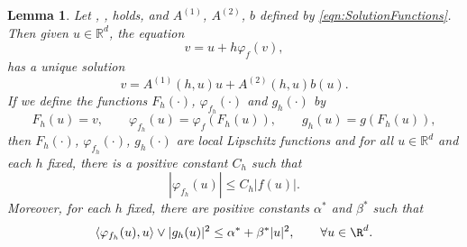 \documentclass[3p]{elsarticle}
\theoremstyle{definition}
\theoremstyle{plain}%
\newtheorem{lem}{Lemma}[section]
\theoremstyle{remark}
\newcommand{\innerprod}[2]{\left\langle#1, #2\right\rangle}
\begin{document}
%
\begin{lem}\label{lem:PhiFhProp}
	Let  , ,  holds, and $A^{(1)}$, $A^{(2)}$, $b$  
	defined by 
	\eqref{eqn:SolutionFunctions}. Then given $u\in\mathbb{R}^d$, the equation
	\begin{equation}\label{eqn:varphiEquation}
		v = u + h \varphi_f(v),
	\end{equation}
	has a unique solution 
	\begin{equation}\label{eqn:varphiEqnSolution}
		v = A^{(1)}(h,u)u +A^{(2)}(h,u) b(u)	.
	\end{equation}
%
	If we define the functions
	$F_h(\cdot)$, $\varphi_{f_h}(\cdot)$ and $g_h(\cdot)$ by
	\begin{equation}\label{eqn:FunctionshDefinition}
		F_h(u) = v,
			\qquad 
			\varphi_{f_h}(u) =\varphi_{f}(F_h(u)),
			\qquad
			g_h(u) = g(F_h(u)),
	\end{equation}
	then $F_h(\cdot)$, $\varphi_{f_h}(\cdot)$, $g_h(\cdot)$ are local Lipschitz functions 
	and for all $u\in \mathbb{R}^d$ and each $h$ fixed, there is a positive constant $C_h$ such that
	\begin{equation}\label{eqn:PhifhFbound}
		|\varphi_{f_h}(u)|\leq C_h |f(u)|. 
	\end{equation} 
	Moreover, for each $h$ fixed,
	 there are positive constants $\alpha^*$ and  $\beta^*$ such that
	\begin{equation}\label{eqn:h-MonotoneCondition}
		\innerprod{\varphi_{f_h}(u)}{u} \vee |g_h(u)|^2 \leq \alpha^* + \beta^* |u|^2, 
		\qquad
		\forall u \in \R^d.
	\end{equation}
\end{lem}
%
\end{document}
